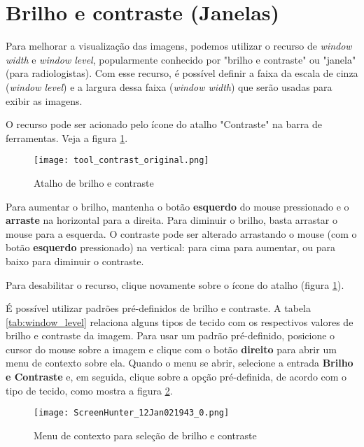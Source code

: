 \section{Brilho e contraste (Janelas)}
\label{sec:ww_wl}

Para melhorar a visualização das imagens, podemos utilizar o recurso de \textit{window width} e
\textit{window level}, popularmente conhecido por "brilho e contraste" ou "janela" (para radiologistas). 
Com esse recurso, é possível definir a faixa da escala de cinza (\textit{window level}) e a
largura dessa faixa (\textit{window width}) que serão usadas para exibir as imagens.

O recurso pode ser acionado pelo ícone do atalho "Contraste" na barra de ferramentas. Veja a figura \ref{fig:window_level_shortcut}.

\begin{figure}[!htb]
\centering
\texttt{[image: tool\_contrast\_original.png]}
\caption{Atalho de brilho e contraste}
\label{fig:window_level_shortcut}
\end{figure}

Para aumentar o brilho, mantenha o botão \textbf{esquerdo} do mouse pressionado e o \textbf{arraste} na 
horizontal para a direita. Para diminuir o brilho, basta arrastar o mouse para a esquerda. O contraste
pode ser alterado arrastando o mouse (com o botão \textbf{esquerdo} pressionado) na vertical: para cima
para aumentar, ou para baixo para diminuir o contraste.

Para desabilitar o recurso, clique novamente sobre o ícone do atalho (figura \ref{fig:window_level_shortcut}).

É possível utilizar padrões pré-definidos de brilho e contraste. A tabela \ref{tab:window_level} relaciona
alguns tipos de tecido com os respectivos valores de brilho e contraste da imagem. Para usar um padrão
pré-definido, posicione o cursor do mouse sobre a imagem e clique com o botão \textbf{direito} para abrir um
menu de contexto sobre ela. Quando o menu se abrir, selecione a entrada \textbf{Brilho e Contraste} e, em
seguida, clique sobre a opção pré-definida, de acordo com o tipo de tecido, como mostra a figura
\ref{fig:window_level}.


\begin{figure}[!htb]
\centering
\texttt{[image: ScreenHunter\_12Jan021943\_0.png]}
\caption{Menu de contexto para seleção de brilho e contraste}
\label{fig:window_level}
\end{figure}

